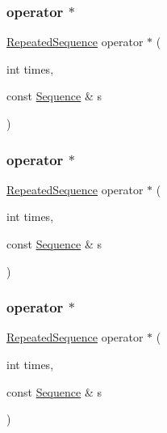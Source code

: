 \subsubsection{\texorpdfstring{operator $\ast$}{operator *}\hspace{0.1cm}{\footnotesize\ttfamily [12/18]}}
{\footnotesize\ttfamily \mbox{\hyperlink{classfakeit_1_1RepeatedSequence}{Repeated\+Sequence}} operator $\ast$ (\begin{DoxyParamCaption}\item[{int}]{times,  }\item[{const \mbox{\hyperlink{classfakeit_1_1Sequence}{Sequence}} \&}]{s }\end{DoxyParamCaption})\hspace{0.3cm}{\ttfamily [friend]}}

\mbox{\label{classfakeit_1_1RepeatedSequence_ae695b1e2c0f00bc6b9a49dd1efcb8f7b}} 
\subsubsection{\texorpdfstring{operator $\ast$}{operator *}\hspace{0.1cm}{\footnotesize\ttfamily [13/18]}}
{\footnotesize\ttfamily \mbox{\hyperlink{classfakeit_1_1RepeatedSequence}{Repeated\+Sequence}} operator $\ast$ (\begin{DoxyParamCaption}\item[{int}]{times,  }\item[{const \mbox{\hyperlink{classfakeit_1_1Sequence}{Sequence}} \&}]{s }\end{DoxyParamCaption})\hspace{0.3cm}{\ttfamily [friend]}}

\mbox{\label{classfakeit_1_1RepeatedSequence_ae695b1e2c0f00bc6b9a49dd1efcb8f7b}} 
\subsubsection{\texorpdfstring{operator $\ast$}{operator *}\hspace{0.1cm}{\footnotesize\ttfamily [14/18]}}
{\footnotesize\ttfamily \mbox{\hyperlink{classfakeit_1_1RepeatedSequence}{Repeated\+Sequence}} operator $\ast$ (\begin{DoxyParamCaption}\item[{int}]{times,  }\item[{const \mbox{\hyperlink{classfakeit_1_1Sequence}{Sequence}} \&}]{s }\end{DoxyParamCaption})\hspace{0.3cm}{\ttfamily [friend]}}

